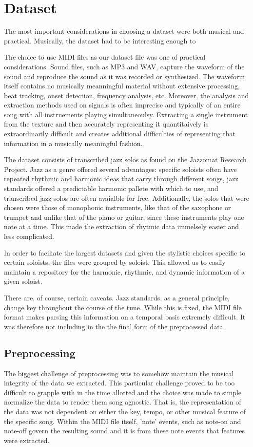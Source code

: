 \documentclass[conference]{IEEEtran}
\begin{document}
\section{Dataset}
The most important considerations in choosing a dataset were both musical and practical. Musically, the dataset had to be interesting enough to

The choice to use MIDI files as our dataset file was one of practical considerations. Sound files, such as MP3 and WAV, capture the waveform of the sound and reproduce the sound as it was recorded or synthesized. The waveform itself contains no musically meanningful material without extensive processing, beat tracking, onset detection, frequency analysis, etc. Moreover, the analysis and extraction methods used on signals is often imprecise and typically of an entire song with all instruements playing simultaneoulsy. Extracting a single instrument from the texture and then accurately representing it quantitaively is extraordinarily difficult and creates additional difficulties of representing that information in a musically meaningful fashion.

The dataset consists of transcribed jazz solos as found on the Jazzomat Research Project. Jazz as a genre offered several advantages: specific soloists often have repeated rhythmic and harmonic ideas that carry through different songs, jazz standards offered a predictable harmonic pallete with which to use, and transcribed jazz solos are often avaialble for free. Additionally, the solos that were chosen were those of monophonic instruments, like that of the saxophone or trumpet and unlike that of the piano or guitar, since these instruments play one note at a time. This made the extraction of rhytmic data immelsely easier and less complicated.

In order to faciliate the largest datasets and given the stylistic choices specific to certain soloists, the files were grouped by soloist. This allowed us to easily maintain a repository for the harmonic, rhythmic, and dynamic information of a given soloist.


There are, of course, certain caveats. Jazz standards, as a general principle, change key throughout the course of the tune. While this is fixed, the MIDI file format makes parsing this information on a temporal basis extremely difficult. It was therefore not including in the the final form of the preprocessed data.

\subsection{Preprocessing}
The biggest challenge of preprocessing was to somehow maintain the musical integrity of the data we extracted. This particular challenge proved to be too difficult to grapple with in the time allotted and the choice was made to simple normalize the data to render them song agnostic. That is, the representation of the data was not dependent on either the key, tempo, or other musical feature of the specific song. Within the MIDI file itself, 'note' events, such as note-on and note-off govern the resulting sound and it is from these note events that features were extracted.
\end{document}
